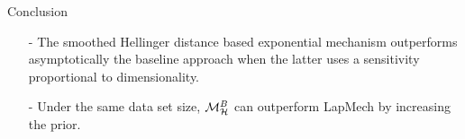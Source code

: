 \documentclass[final,hyperref={pdfpagelabels=false}]{beamer}
\begin{document}
\begin{frame}[t]
\begin{columns}[t]
\begin{column}{.485\textwidth}
\begin{block}{Conclusion}
\begin{itemize}
  \item[-] The smoothed Hellinger distance based exponential mechanism outperforms asymptotically the baseline 
  approach when the latter uses a sensitivity proportional to dimensionality.
  \item[-] Under the same data set size, $\mathcal{M}^{B}_{\mathcal{H}}$ can outperform LapMech by increasing the prior.
    


\end{itemize}
\end{block}













\end{column}
\end{columns}
\end{frame}
\end{document}
